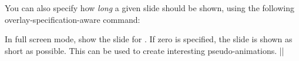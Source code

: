 You can also specify how \emph{long} a given slide should be shown, using the following overlay-specification-aware command:

\begin{command}{\transduration{}}
  In full screen mode, show the slide for . If zero is specified, the slide is shown as short as possible. This can be used to create interesting pseudo-animations.
  \example||
\end{command}
